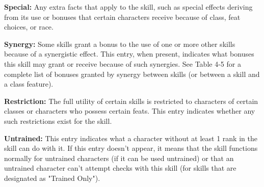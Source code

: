 \textbf{Special:} Any extra facts that apply to the skill, such as special effects deriving from its use or bonuses that certain characters receive because of class, feat choices, or race.

\textbf{Synergy:} Some skills grant a bonus to the use of one or more other skills because of a synergistic effect. This entry, when present, indicates what bonuses this skill may grant or receive because of such synergies. See Table 4-5 for a complete list of bonuses granted by synergy between skills (or between a skill and a class feature).

\textbf{Restriction:} The full utility of certain skills is restricted to characters of certain classes or characters who possess certain feats. This entry indicates whether any such restrictions exist for the skill.

\textbf{Untrained:} This entry indicates what a character without at least 1 rank in the skill can do with it. If this entry doesn't appear, it means that the skill functions normally for untrained characters (if it can be used untrained) or that an untrained character can't attempt checks with this skill (for skills that are designated as "Trained Only").




































